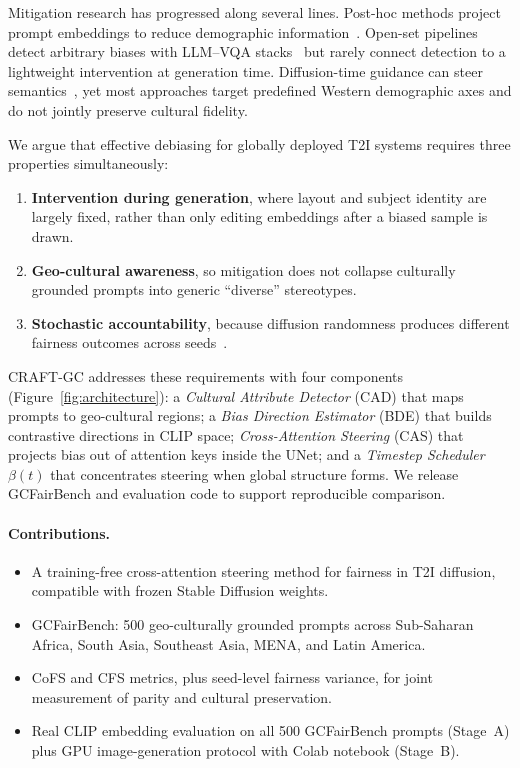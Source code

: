 \documentclass[11pt,a4paper]{article}
\begin{document}
Mitigation research has progressed along several lines. Post-hoc methods project prompt embeddings to reduce demographic information~\cite{kleindessner2023fairpca,fu2025fairimagen,chuang2023debiasvl}. Open-set pipelines detect arbitrary biases with LLM--VQA stacks~\cite{dinca2024openbias} but rarely connect detection to a lightweight intervention at generation time. Diffusion-time guidance can steer semantics~\cite{brack2023sega,friedrich2023fairdiffusion,kang2025fairgen,parihar2024balancing}, yet most approaches target predefined Western demographic axes and do not jointly preserve cultural fidelity.

We argue that effective debiasing for globally deployed T2I systems requires three properties simultaneously:
\begin{enumerate}
  \item \textbf{Intervention during generation}, where layout and subject identity are largely fixed, rather than only editing embeddings after a biased sample is drawn.
  \item \textbf{Geo-cultural awareness}, so mitigation does not collapse culturally grounded prompts into generic ``diverse'' stereotypes.
  \item \textbf{Stochastic accountability}, because diffusion randomness produces different fairness outcomes across seeds~\cite{seshadri2024amplification,smith2026operationalizing}.
\end{enumerate}

CRAFT-GC addresses these requirements with four components (Figure~\ref{fig:architecture}): a \textit{Cultural Attribute Detector} (CAD) that maps prompts to geo-cultural regions; a \textit{Bias Direction Estimator} (BDE) that builds contrastive directions in CLIP space; \textit{Cross-Attention Steering} (CAS) that projects bias out of attention keys inside the UNet; and a \textit{Timestep Scheduler} $\beta(t)$ that concentrates steering when global structure forms. We release GCFairBench and evaluation code to support reproducible comparison.

\paragraph{Contributions.}
\begin{itemize}
  \item A training-free cross-attention steering method for fairness in T2I diffusion, compatible with frozen Stable Diffusion weights.
  \item GCFairBench: 500 geo-culturally grounded prompts across Sub-Saharan Africa, South Asia, Southeast Asia, MENA, and Latin America.
  \item CoFS and CFS metrics, plus seed-level fairness variance, for joint measurement of parity and cultural preservation.
  \item Real CLIP embedding evaluation on all 500 GCFairBench prompts (Stage~A) plus GPU image-generation protocol with Colab notebook (Stage~B).
\end{itemize}
\end{document}
